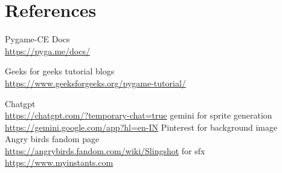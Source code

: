 \documentclass[10pt]{article}
\begin{document}
\section{References}
\begin{thebibliography}{9}
    Pygame-CE Docs \\
    \url{https://pyga.me/docs/}

    Geeks for geeks tutorial blogs \\
    \url{https://www.geeksforgeeks.org/pygame-tutorial/}

    Chatgpt \\
    \url{https://chatgpt.com/?temporary-chat=true}
    gemini for sprite generation \\
    \url{https://gemini.google.com/app?hl=en-IN}
    Pinterest for background image \\
    Angry birds fandom page \\
    \url{https://angrybirds.fandom.com/wiki/Slingshot}
    for sfx
    \url{https://www.myinstants.com}
    
\end{thebibliography}
\end{document}
